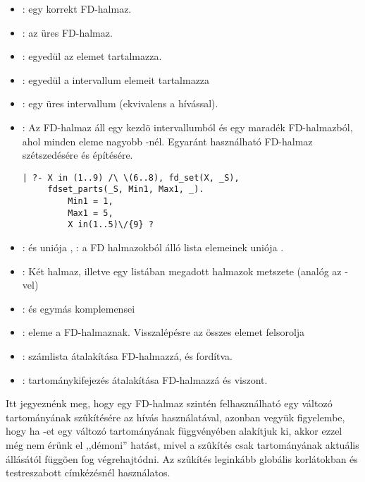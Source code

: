 \begin{itemize}
\item {}:  egy korrekt FD-halmaz.
\item {}:  az üres FD-halmaz.
\item {}:  egyedül az  elemet tartalmazza.
\item {}:  egyedül a 
intervallum elemeit tartalmazza
\item {}:  egy üres intervallum
(ekvivalens a  hívással).
\item {}: Az  FD-halmaz áll egy
 kezdõ intervallumból és egy  maradék FD-halmazból, ahol
 minden eleme nagyobb -nél. Egyaránt használható
FD-halmaz szétszedésére és építésére.
\begin{verbatim}
| ?- X in (1..9) /\ \(6..8), fd_set(X, _S), 
     fdset_parts(_S, Min1, Max1, _).
         Min1 = 1, 
         Max1 = 5, 
         X in(1..5)\/{9} ? 
\end{verbatim}
\item {}:  és 
uniója ,  
: a  FD halmazokból
álló lista elemeinek uniója .
\item {} : Két halmaz, illetve egy listában
megadott halmazok metszete (analóg az -vel)
\item {}:  és  egymás
komplemensei
\item {}:  eleme a  FD-halmaznak.
Visszalépésre az összes elemet felsorolja
\item {}: számlista
átalakítása FD-halmazzá, és fordítva.
\item {}:
tartománykifejezés átalakítása FD-halmazzá és viszont.
\end{itemize}

Itt jegyeznénk meg, hogy egy FD-halmaz szintén felhasználható egy változó
tartományának szûkítésére az  hívás használatával, azonban
vegyük figyelembe, hogy ha -et egy  változó tartományának
függvényében alakítjuk ki, akkor ezzel még nem érünk el ,,démoni'' hatást,
mivel a szûkítés csak  tartományának aktuális állásától függõen
fog végrehajtódni. Az  szûkítés leginkább globális korlátokban
és testreszabott címkézésnél használatos.

